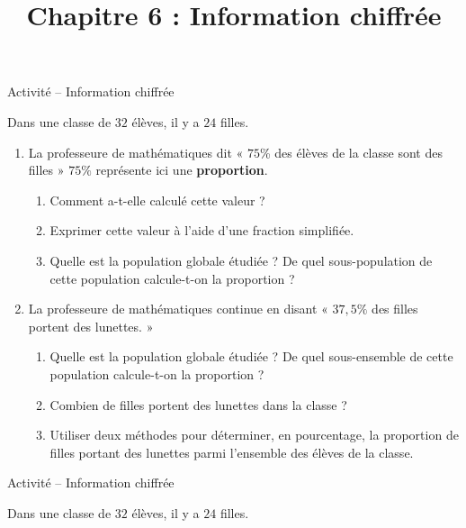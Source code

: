 \documentclass[11pt]{article}
\title{Chapitre 6 : Information chiffrée}
\date{}
\author{}
\begin{document}
\begin{center}
  \LARGE Activité -- Information chiffrée
\end{center}
Dans une classe de $32$ élèves, il y a $24$ filles.
\begin{enumerate}
  \item La professeure de mathématiques dit « $75$\% des élèves de la classe
    sont des filles » $75\%$ représente ici une \textbf{proportion}.
    \begin{enumerate}
      \item Comment a-t-elle calculé cette valeur ?
      \item Exprimer cette valeur à l'aide d'une fraction simplifiée.
      \item Quelle est la population globale étudiée ? De quel sous-population
        de cette population calcule-t-on la proportion ?
    \end{enumerate}
  \item La professeure de mathématiques continue en disant « $37,5\%$ des filles
    portent des lunettes. »
    \begin{enumerate}
      \item Quelle est la population globale étudiée ? De quel sous-ensemble de
        cette population calcule-t-on la proportion ?
      \item Combien de filles portent des lunettes dans la classe ?
      \item Utiliser deux méthodes pour déterminer, en pourcentage, la
        proportion de filles portant des lunettes parmi l'ensemble des élèves de
        la classe.
    \end{enumerate}
\end{enumerate}
\vspace{1cm}
\begin{center}
  \LARGE Activité -- Information chiffrée
\end{center}
Dans une classe de $32$ élèves, il y a $24$ filles.
\end{document}
